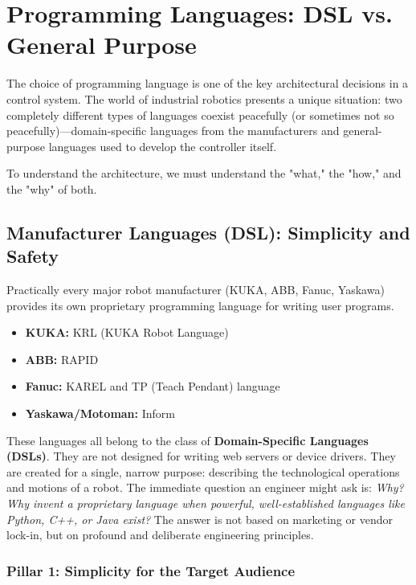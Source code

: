 \section{Programming Languages: DSL vs. General Purpose}
\label{sec:dsl_vs_gp}

The choice of programming language is one of the key architectural decisions in a control system. The world of industrial robotics presents a unique situation: two completely different types of languages coexist peacefully (or sometimes not so peacefully)—domain-specific languages from the manufacturers and general-purpose languages used to develop the controller itself.

To understand the architecture, we must understand the "what," the "how," and the "why" of both.

\subsection{Manufacturer Languages (DSL): Simplicity and Safety}
\label{subsec:dsl_languages}

Practically every major robot manufacturer (KUKA, ABB, Fanuc, Yaskawa) provides its own proprietary programming language for writing user programs.
\begin{itemize}
    \item \textbf{KUKA:} KRL (KUKA Robot Language)
    \item \textbf{ABB:} RAPID
    \item \textbf{Fanuc:} KAREL and TP (Teach Pendant) language
    \item \textbf{Yaskawa/Motoman:} Inform
\end{itemize}

These languages all belong to the class of \textbf{Domain-Specific Languages (DSLs)}. They are not designed for writing web servers or device drivers. They are created for a single, narrow purpose: describing the technological operations and motions of a robot. The immediate question an engineer might ask is: \textit{Why? Why invent a proprietary language when powerful, well-established languages like Python, C++, or Java exist?} The answer is not based on marketing or vendor lock-in, but on profound and deliberate engineering principles.

\subsubsection{Pillar 1: Simplicity for the Target Audience}
\label{subsubsec:dsl_simplicity}

